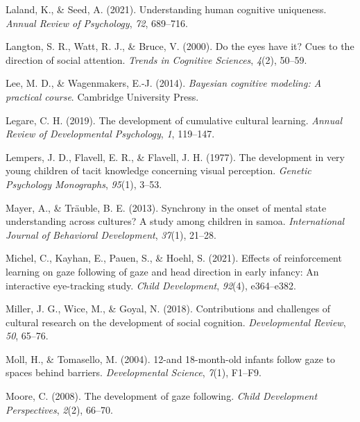 \documentclass[
  man,floatsintext]{apa6}
\newlength{\cslhangindent}
\newlength{\cslentryspacingunit} %
\newenvironment{CSLReferences}[2] %
 {%
  \setlength{\parindent}{0pt}
  \ifodd #1
  \let\oldpar\par
  \def\par{\hangindent=\cslhangindent\oldpar}
  \fi
  \setlength{\parskip}{#2\cslentryspacingunit}
 }%
 {}
\begin{document}
\begin{CSLReferences}{1}{0}
\leavevmode{}%
Laland, K., \& Seed, A. (2021). Understanding human cognitive uniqueness. \emph{Annual Review of Psychology}, \emph{72}, 689--716.

\leavevmode{}%
Langton, S. R., Watt, R. J., \& Bruce, V. (2000). Do the eyes have it? Cues to the direction of social attention. \emph{Trends in Cognitive Sciences}, \emph{4}(2), 50--59.

\leavevmode{}%
Lee, M. D., \& Wagenmakers, E.-J. (2014). \emph{Bayesian cognitive modeling: A practical course}. Cambridge University Press.

\leavevmode{}%
Legare, C. H. (2019). The development of cumulative cultural learning. \emph{Annual Review of Developmental Psychology}, \emph{1}, 119--147.

\leavevmode{}%
Lempers, J. D., Flavell, E. R., \& Flavell, J. H. (1977). The development in very young children of tacit knowledge concerning visual perception. \emph{Genetic Psychology Monographs}, \emph{95}(1), 3--53.

\leavevmode{}%
Mayer, A., \& Träuble, B. E. (2013). Synchrony in the onset of mental state understanding across cultures? A study among children in samoa. \emph{International Journal of Behavioral Development}, \emph{37}(1), 21--28.

\leavevmode{}%
Michel, C., Kayhan, E., Pauen, S., \& Hoehl, S. (2021). Effects of reinforcement learning on gaze following of gaze and head direction in early infancy: An interactive eye-tracking study. \emph{Child Development}, \emph{92}(4), e364--e382.

\leavevmode{}%
Miller, J. G., Wice, M., \& Goyal, N. (2018). Contributions and challenges of cultural research on the development of social cognition. \emph{Developmental Review}, \emph{50}, 65--76.

\leavevmode{}%
Moll, H., \& Tomasello, M. (2004). 12-and 18-month-old infants follow gaze to spaces behind barriers. \emph{Developmental Science}, \emph{7}(1), F1--F9.

\leavevmode{}%
Moore, C. (2008). The development of gaze following. \emph{Child Development Perspectives}, \emph{2}(2), 66--70.


\end{CSLReferences}
\end{document}
